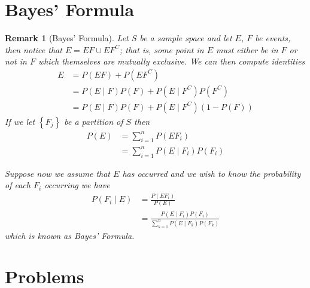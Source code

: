 \documentclass[11pt, oneside]{book}   	%
\newtheorem{remark}{Remark}[chapter]
\begin{document}
\begin{spacing}{1.618}
\section{Bayes' Formula}

\begin{remark}[Bayes' Formula]
	Let $S$ be a sample space and let $E$, $F$ be events, then notice that $E=EF \cup EF^C$; that is, some point in $E$ must either be in $F$ or not in $F$ which themselves are mutually exclusive. We can then compute identities 
	\begin{alignat}{4}
		E&=P(EF)+P\left(EF^C\right) \\
			&=P(E\mid F)P(F)+P\left(E\mid F^C\right)P\left(F^C\right) \\
			&=P(E\mid F)P(F)+P\left(E\mid F^C\right)\left(1-P(F)\right)
	\end{alignat}
	If we let $\left\{F_j\right\}$ be a partition of $S$ then 
	\begin{alignat}{4}
		P(E)&=\sum_{i=1}^nP(EF_i) \\
			&=\sum_{i=1}^nP(E\mid F_i)P(F_i)
	\end{alignat} 
	
	Suppose now we assume that $E$ has occurred and we wish to know the probability of each $F_i$ occurring we have 
	\begin{alignat}{4}
		P(F_i\mid E)&=\frac{P(EF_i)}{P(E)} \\
			&=\frac{P(E\mid F_i)P(F_i)}{\sum_{k=1}^nP(E\mid F_k)P(F_k)}
	\end{alignat}
	which is known as Bayes' Formula. 
\end{remark}

\section{Problems}


\end{spacing}
\end{document}
